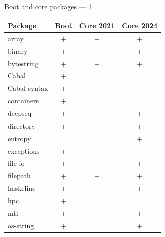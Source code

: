 \documentclass[handout]{beamer}
\begin{document}
\begin{frame}{Boot and core packages --- 1}


\begin{table}[c]
\begin{tabular}{lccc}
Package          & Boot & Core 2021 & Core 2024 \\
\hline
array            & +    & +         & +         \\
binary           & +    &           & \cellcolor{green}+          \\
bytestring       & +    & +         & +         \\
Cabal            & \cellcolor{red}+    &           &           \\
Cabal-syntax     & \cellcolor{red}+    &           &           \\
containers       & \cellcolor{red}+    &           &           \\
deepseq          & +    & +         & +         \\
directory        & +    & +         & +         \\
entropy          &      &           & \cellcolor{green}+         \\
exceptions       & \cellcolor{red}+    &           &           \\
file-io          & +    &           & \cellcolor{green}+         \\
filepath         & +    & +         & +         \\
haskeline        & +    &           & \cellcolor{green}+         \\
hpc              & \cellcolor{red}+    &           &           \\
mtl              & +    & +         & +         \\
os-string        & +    &           & \cellcolor{green}+         \\
\end{tabular}
\end{table}

\end{frame}
\end{document}
